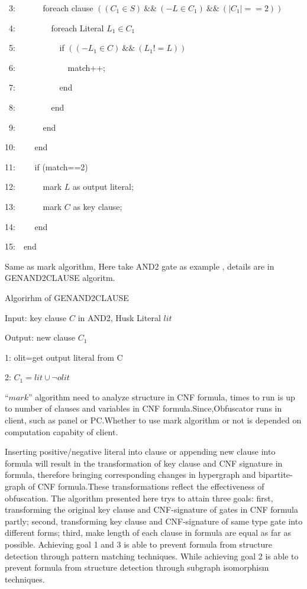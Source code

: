 \documentclass[runningheads,a4paper]{llncs}
\begin{document}
~3:~~~~~~	   foreach clause $((C_1 \in S) ~\&\&~ (-L\in C_1)~ \&\&~ (|C_1|==2)) $

~4:~~~~~~~~		foreach Literal $ L_1 \in C_1$ 

~5:~~~~~~~~~~		  if $((-L_1 \in C)~\&\&~(L_1!=L))$

~6:~~~~~~~~~~~~				match++;

~7:~~~~~~~~~~		  end

~8:~~~~~~~~		end

~9:~~~~~~          end 

10:~~~~	    end

11:~~~~     if (match==2)

12:~~~~~~	  mark $L$ as output literal;

13:~~~~~~	  mark $C$ as key clause;

14:~~~~     end

15:~~end


Same as mark algorithm, Here take AND2 gate as example , details are in GENAND2CLAUSE algoritm.

\noindent Algorirhm of GENAND2CLAUSE

Input: key clause $C$ in AND2, Husk Literal $lit$

Output: new clause $C_1$

1: olit=get output literal from C

2: $C_1= lit \cup \neg olit$

$“mark”$ algorithm need to analyze structure in CNF formula, times to run is up to number of clauses and variables in CNF formula.Since,Obfuscator runs in client, such as panel or PC.Whether to use mark algorithm or not is depended on computation capabity of client.

Inserting positive/negative literal into clause or appending new clause into formula will result in the transformation of key clause and CNF signature in formula, therefore bringing corresponding changes in hypergraph and bipartite-graph of CNF formula.These transformations reflect the effectiveness of obfuscation. The algorithm presented here trys to attain three goals: first, transforming the original key clause and CNF-signature of gates in CNF formula partly; second, transforming key clause and CNF-signature of same type gate into different forms; third, make length of each clause in formula are equal as far as possible. Achieving goal 1 and 3 is able to prevent formula from structure detection through pattern matching techniques. While achieving goal 2 is able to prevent formula from structure detection through subgraph isomorphism techniques. 
\end{document}
